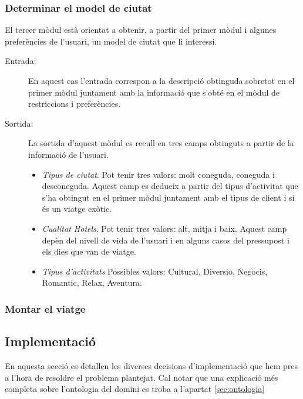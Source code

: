 \documentclass[11pt,a4paper]{article}
\begin{document}
\subsubsection*{Determinar el model de ciutat}

El tercer mòdul està orientat a obtenir, a partir del primer mòdul i algunes preferències de l'usuari, un model de ciutat que li interessi.

\begin{description}
	\item[Entrada:] En aquest cas l'entrada correspon a la descripció obtinguda sobretot en el primer mòdul juntament amb la informació que s'obté en el mòdul de restriccions i preferències. 

	\item[Sortida:] La sortida d'aquest mòdul es recull en tres camps obtinguts a partir de la informació de l'usuari. 
	\begin{itemize}
	\item \emph{Tipus de ciutat}. Pot tenir tres valors: molt coneguda, coneguda i desconeguda.
	Aquest camp es dedueix a partir del tipus d'activitat que s'ha obtingut en el primer mòdul juntament amb el tipus de client i si és un viatge exòtic.
	\item \emph{Cualitat Hotels}. Pot tenir tres valors: alt, mitja i baix.
	Aquest camp depèn del nivell de vida de l'usuari i en alguns casos del pressupost i els dies que van de viatge.
	\item \emph{Tipus d'activitats} Possibles valors: Cultural, Diversio, Negocis, Romantic, Relax, Aventura.
	
	\end{itemize}

\end{description}


\subsubsection*{Montar el viatge}



\subsection{Implementació}
\label{sec:implementacio}
En aquesta secció es detallen les diverses decisions d'implementació que hem pres a l'hora de resoldre el problema plantejat. Cal notar que una explicació més completa sobre l'ontologia del domini es troba a l'apartat \ref{sec:ontologia}  
\end{document}
